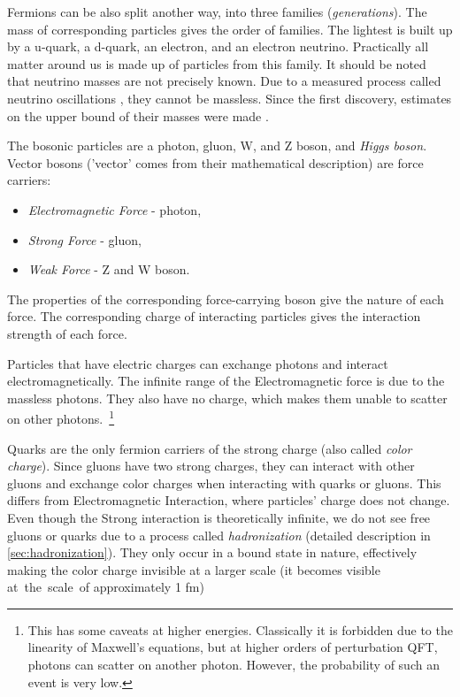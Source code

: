 Fermions can be also split another way, into three families (\emph{generations}). 
The mass of corresponding particles gives the order of families.
The lightest is built up by a u-quark, a d-quark, an electron, and an electron neutrino.
Practically all matter around us is made up of particles from this family.
It should be noted that neutrino masses are not precisely known.
Due to a measured process \cite{sadbury} called neutrino oscillations \cite{pdg}, they cannot be massless.
Since the first discovery, estimates on the upper bound of their masses were made \cite{pdg}.

The bosonic particles are a photon, gluon, W, and Z boson, and \emph{Higgs boson}. 
Vector bosons ('vector' comes from their mathematical description) are force carriers:
\begin{itemize}
    \item \emph{Electromagnetic Force} - photon,
    \item \emph{Strong Force} - gluon,
    \item \emph{Weak Force} - Z and W boson.
\end{itemize}
The properties of the corresponding force-carrying boson give the nature of each force.
The corresponding charge of interacting particles gives the interaction strength of each force.

Particles that have electric charges can exchange photons and interact electromagnetically.
The infinite range of the Electromagnetic force is due to the massless photons.
They also have no charge, which makes them unable to scatter on other photons.~\footnote{This has some caveats at higher energies. Classically it is forbidden due to the linearity of Maxwell's equations, but at higher orders of perturbation QFT, photons can scatter on another photon. However, the probability of such an event is very low.}

Quarks are the only fermion carriers of the strong charge (also called \emph{color charge}). 
Since gluons have two strong charges, they can interact with other gluons and exchange color charges when interacting with quarks or gluons.
This differs from Electromagnetic Interaction, where particles' charge does not change. 
Even though the Strong interaction is theoretically infinite, we do not see free gluons or quarks due to a process called \emph{hadronization} (detailed description in \cref{sec:hadronization}).
They only occur in a bound state in nature, effectively making the color charge invisible at a larger scale (it becomes visible at~the~scale~of approximately 1 fm)

